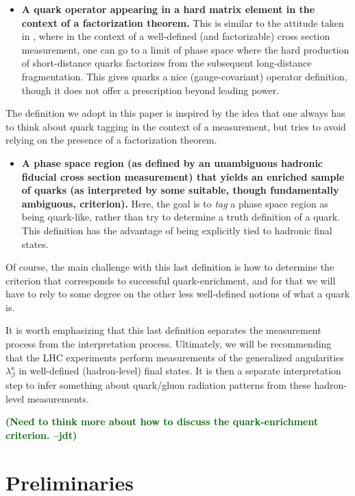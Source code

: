 \documentclass[11pt,letterpaper]{article}
\newcommand{\jdt}[1]{\textbf{\textcolor{darkgreen}{(#1 --jdt)}}}
\begin{document}
\begin{itemize}
\item \textbf{A quark operator appearing in a hard matrix element in the context of a factorization theorem.}  This is similar to the attitude taken in \cite{}, where in the context of a well-defined (and factorizable) cross section measurement, one can go to a limit of phase space where the hard production of short-distance quarks factorizes from the subsequent long-distance fragmentation.  This gives quarks a nice (gauge-covariant) operator definition, though it does not offer a prescription beyond leading power.
\end{itemize}
The definition we adopt in this paper is inspired by the idea that one always has to think about quark tagging in the context of a measurement, but tries to avoid relying on the presence of a factorization theorem.
\begin{itemize}
\item \textbf{A phase space region (as defined by an unambiguous hadronic fiducial cross section measurement) that yields an enriched sample of quarks (as interpreted by some suitable, though fundamentally ambiguous, criterion).}  Here, the goal is to \emph{tag} a phase space region as being quark-like, rather than try to determine a truth definition of a quark.  This definition has the advantage of being explicitly tied to hadronic final states.  
\end{itemize}  
Of course, the main challenge with this last definition is how to determine the criterion that corresponds to successful quark-enrichment, and for that we will have to rely to some degree on the other less well-defined notions of what a quark is.

It is worth emphasizing that this last definition separates the measurement process from the interpretation process.  Ultimately, we will be recommending that the LHC experiments perform measurements of the generalized angularities $\lambda_\beta^\kappa$ in well-defined (hadron-level) final states.  It is then a separate interpretation step to infer something about quark/gluon radiation patterns from these hadron-level measurements.

\jdt{Need to think more about how to discuss the quark-enrichment criterion.}





\section{Preliminaries}
\label{sec:prelim}
\end{document}
